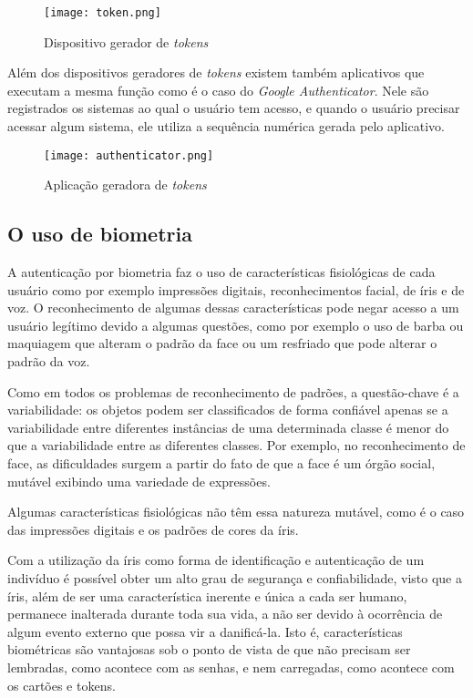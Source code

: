 \begin{figure}[!htb]
	\centering
	\texttt{[image: token.png]}
	\small
	\caption[Dispositivo gerador de \textit{tokens}]{Dispositivo gerador de \textit{tokens}}
	\label{fig:token}
\end{figure}

Além dos dispositivos geradores de \textit{tokens} existem também aplicativos que executam a mesma função como é o caso do \textit{Google Authenticator}. Nele são registrados os sistemas ao qual o usuário tem acesso, e quando o usuário precisar acessar algum sistema, ele utiliza a sequência numérica gerada pelo aplicativo.

\begin{figure}[!htb]
	\centering
	\texttt{[image: authenticator.png]}
	\small
	\caption[Aplicação geradora de \textit{tokens}]{Aplicação geradora de \textit{tokens}}
	\label{fig:token}
\end{figure}

\subsection{O uso de biometria}
A autenticação por biometria faz o uso de características fisiológicas de cada usuário como por exemplo impressões digitais, reconhecimentos facial, de íris e de voz.
O reconhecimento de algumas dessas características pode negar acesso a um usuário legítimo devido a algumas questões, como por exemplo o uso de barba ou maquiagem que alteram o padrão da face ou um resfriado que pode alterar o padrão da voz.

\begin{citacao}
Como em todos os problemas de reconhecimento de padrões, a questão-chave é a variabilidade: os objetos podem ser classificados de forma confiável apenas se a variabilidade entre diferentes instâncias de uma determinada classe é menor do que a variabilidade entre as diferentes classes. Por exemplo, no reconhecimento de face, as dificuldades surgem a partir do fato de que a face é um órgão social, mutável exibindo uma variedade de expressões. \cite{Daugman2004}
\end{citacao}

Algumas características fisiológicas não têm essa natureza mutável, como é o caso das impressões digitais e os padrões de cores da íris.

\begin{citacao}
Com a utilização da íris como forma de identificação e autenticação de um indivíduo é possível obter um alto grau de segurança e confiabilidade, visto que a íris, além de ser uma característica inerente e única a cada ser humano, permanece inalterada durante toda sua vida, a não ser devido à ocorrência de algum evento externo que possa vir a danificá-la. Isto é, características biométricas são vantajosas sob o ponto de vista de que não precisam ser lembradas, como acontece com as senhas, e nem carregadas, como acontece com os cartões e tokens. \cite{priscila2007}
\end{citacao}

